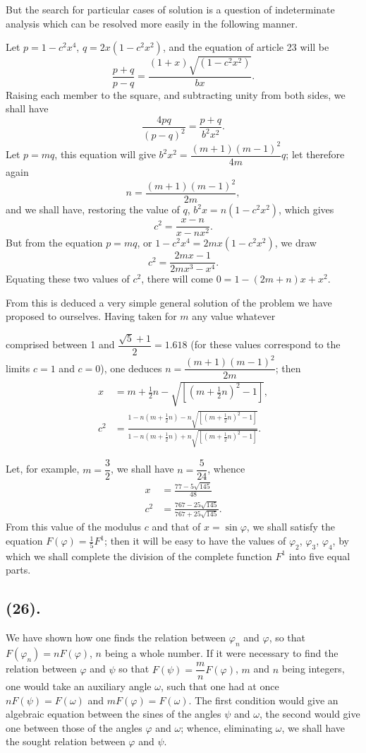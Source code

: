 \documentclass{article}
\begin{document}
But the search for particular cases of solution is a question of indeterminate analysis which can be resolved more easily in the following manner.

Let $p=1-c^{2}x^{4}$, $q=2x(1-c^{2}x^{2})$, and the equation of article 23 will be
\[ \frac{p+q}{p-q}=\frac{(1+x)\sqrt{(1-c^{2}x^{2})}}{bx}. \]
Raising each member to the square, and subtracting unity from both sides, we shall have
\[ \frac{4pq}{(p-q)^{2}}=\frac{p+q}{b^{2}x^{2}}. \]
Let $p=mq$, this equation will give $b^{2}x^{2}=\dfrac{(m+1)(m-1)^{2}}{4m}q$; let therefore again
\[ n=\frac{(m+1)(m-1)^{2}}{2m}, \]
and we shall have, restoring the value of $q$, $b^{2}x=n(1-c^{2}x^{2})$, which gives
\[ c^{2}=\frac{x-n}{x-nx^{2}}. \]
But from the equation $p=mq$, or $1-c^{2}x^{4}=2mx(1-c^{2}x^{2})$, we draw
\[ c^{2}=\frac{2mx-1}{2mx^{3}-x^{4}}. \]
Equating these two values of $c^{2}$, there will come $0=1-(2m+n)x+x^{2}$.

From this is deduced a very simple general solution of the problem we have proposed to ourselves. Having taken for $m$ any value whatever

comprised between 1 and $\dfrac{\sqrt{5}+1}{2}=1.618$ (for these values correspond to the limits $c=1$ and $c=0$), one deduces $n=\dfrac{(m+1)(m-1)^{2}}{2m}$; then
\[ \begin{aligned} x &= m+\tfrac{1}{2}n-\sqrt{[(m+\tfrac{1}{2}n)^{2}-1]}, \\ c^{2} &= \frac{1-n(m+\frac{1}{2}n)-n\sqrt{[(m+\frac{1}{2}n)^{2}-1]}}{1-n(m+\frac{1}{2}n)+n\sqrt{[(m+\frac{1}{2}n)^{2}-1]}}. \end{aligned} \]

Let, for example, $m=\dfrac{3}{2}$, we shall have $n=\dfrac{5}{24}$, whence
\[ \begin{aligned} x &= \frac{77-5\sqrt{145}}{48} \\ c^{2} &= \frac{767-25\sqrt{145}}{767+25\sqrt{145}}. \end{aligned} \]
From this value of the modulus $c$ and that of $x=\sin\varphi$, we shall satisfy the equation $F(\varphi)=\frac{1}{5}F^{1}$; then it will be easy to have the values of $\varphi_{2}$, $\varphi_{3}$, $\varphi_{4}$, by which we shall complete the division of the complete function $F^{1}$ into five equal parts.

\subsection*{(26).}

We have shown how one finds the relation between $\varphi_{n}$ and $\varphi$, so that $F(\varphi_{n})=nF(\varphi)$, $n$ being a whole number. If it were necessary to find the relation between $\varphi$ and $\psi$ so that $F(\psi)=\dfrac{m}{n}F(\varphi)$, $m$ and $n$ being integers, one would take an auxiliary angle $\omega$, such that one had at once $nF(\psi)=F(\omega)$ and $mF(\varphi)=F(\omega)$. The first condition would give an algebraic equation between the sines of the angles $\psi$ and $\omega$, the second would give one between those of the angles $\varphi$ and $\omega$; whence, eliminating $\omega$, we shall have the sought relation between $\varphi$ and $\psi$.
\end{document}
